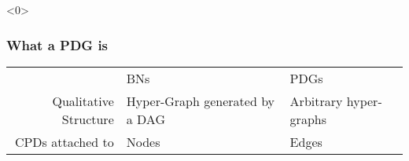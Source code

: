 \begin{frame}<0> %
    \frametitle{What a PDG is}

    {\renewcommand{\arraystretch}{1.25}
    \begin{tabular}{r|p{}p{}}
                \addlinespace[-\aboverulesep]
                \cmidrule[\heavyrulewidth]{2-3}
            & BNs & PDGs \pause \\ \cmidrule{2-3}
        Qualitative Structure
            & Hyper-Graph generated by a DAG
            & Arbitrary hyper-graphs  \pause \\[1em]
        CPDs attached to
            & Nodes
            & Edges
            \\ \bottomrule
    \end{tabular}}


    \end{frame}%
	
